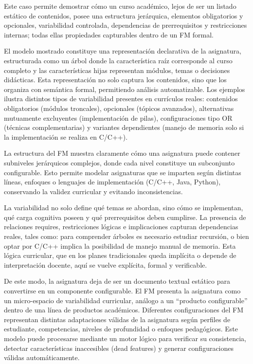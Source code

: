 {{{            Este caso permite demostrar cómo un curso académico, lejos de ser un 
            listado estático de contenidos, posee una estructura jerárquica, 
            elementos obligatorios y opcionales, variabilidad controlada, 
            dependencias de prerrequisitos y restricciones internas; todas 
            ellas propiedades capturables dentro de un FM formal.

            El modelo mostrado constituye una representación declarativa de la asignatura, 
            estructurada como un árbol donde la característica raíz corresponde al curso 
            completo y las características hijas representan módulos, temas o decisiones 
            didácticas. Esta representación no solo captura los contenidos, sino que los 
            organiza con semántica formal, permitiendo análisis automatizable. Los ejemplos 
            ilustra distintos tipos de variabilidad presentes en currículos reales:
            contenidos obligatorios (módulos troncales), opcionales (tópicos avanzados), 
            alternativas mutuamente excluyentes (implementación de pilas), configuraciones 
            tipo OR (técnicas complementarias) y variantes dependientes 
            (manejo de memoria solo si la implementación se realiza en C/C++).

            La estructura del FM muestra claramente cómo una asignatura puede contener 
            subniveles jerárquicos complejos, donde cada nivel constituye un subconjunto 
            configurable. Esto permite modelar asignaturas que se imparten según distintas 
            líneas, enfoques o lenguajes de implementación (C/C++, Java, Python), conservando 
            la validez curricular y evitando inconsistencias.

            La variabilidad no solo define qué temas se abordan, sino cómo se implementan, 
            qué carga cognitiva poseen y qué prerrequisitos deben cumplirse. La presencia de 
            relaciones requires, restricciones lógicas e implicaciones capturan dependencias 
            reales, tales como: para comprender árboles es necesario estudiar recursión, o 
            bien optar por C/C++ implica la posibilidad de manejo manual de memoria. 
            Esta lógica curricular, que en los planes tradicionales queda implícita o 
            depende de interpretación docente, aquí se vuelve explícita, formal y verificable.

            De este modo, la asignatura deja de ser un documento textual estático para 
            convertirse en un componente configurable. El FM presenta la asignatura como un 
            micro-espacio de variabilidad curricular, análogo a un “producto configurable” 
            dentro de una línea de productos académicos. Diferentes configuraciones del FM 
            representan distintas adaptaciones válidas de la asignatura según perfiles de 
            estudiante, competencias, niveles de profundidad o enfoques pedagógicos. 
            Este modelo puede procesarse mediante un motor lógico para verificar su 
            consistencia, detectar características inaccesibles (dead features) y generar 
            configuraciones válidas automáticamente.

}}}
